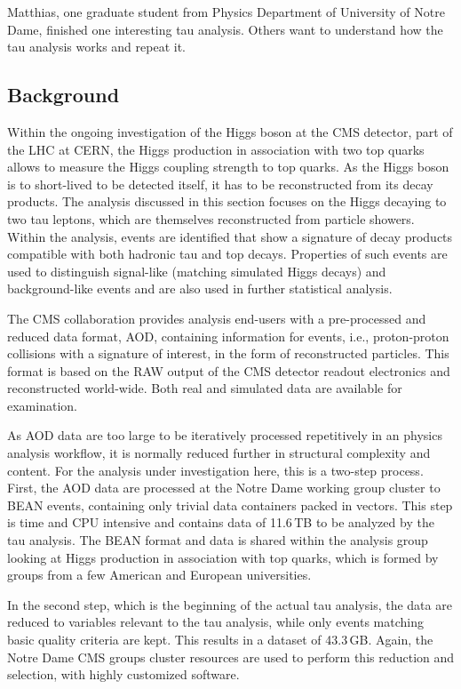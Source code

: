 \documentclass{acm_proc_article-sp}
\begin{document}
Matthias, one graduate student from Physics Department of University of Notre
Dame, finished one interesting tau analysis. Others want to understand how the tau
analysis works and repeat it. 

\subsection{Background}

Within the ongoing investigation of the Higgs boson at the CMS
detector, part of the LHC at CERN, the Higgs production in association
with two top quarks allows to measure the Higgs coupling strength to
top quarks.  As the Higgs boson is to short-lived to be detected
itself, it has to be reconstructed from its decay products.  The
analysis discussed in this section focuses on the Higgs decaying to
two tau leptons, which are themselves reconstructed from particle
showers.  Within the analysis, events are identified that show a
signature of decay products compatible with both hadronic tau and top
decays.  Properties of such events are used to distinguish signal-like
(matching simulated Higgs decays) and background-like events and are
also used in further statistical analysis.

The CMS collaboration provides analysis end-users with a pre-processed
and reduced data format, AOD, containing information for events, i.e.,
proton-proton collisions with a signature of interest, in the form of
reconstructed particles.  This format is based on the RAW output of
the CMS detector readout electronics and reconstructed world-wide.
Both real and simulated data are available for examination.

As AOD data are too large to be iteratively processed repetitively in
an physics analysis workflow, it is normally reduced further in
structural complexity and content.  For the analysis under
investigation here, this is a two-step process.  First, the AOD data
are processed at the Notre Dame working group cluster to BEAN events,
containing only trivial data containers packed in vectors.  This step
is time and CPU intensive and contains data of 11.6$\,$TB to be
analyzed by the tau analysis.  The BEAN format and data is shared
within the analysis group looking at Higgs production in association
with top quarks, which is formed by groups from a few American and
European universities.

In the second step, which is the beginning of the actual tau analysis,
the data are reduced to variables relevant to the tau analysis, while
only events matching basic quality criteria are kept.  This results in
a dataset of 43.3$\,$GB.  Again, the Notre Dame CMS groups cluster
resources are used to perform this reduction and selection, with
highly customized software.
\end{document}
